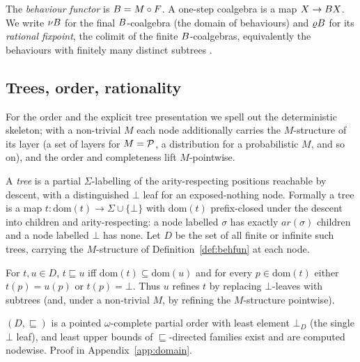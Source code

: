 \begin{definition}\label{def:behfun}
  The \emph{behaviour functor} is $B = M\circ F$. A one-step coalgebra is a map $X \to B X$. We
  write $\nu B$ for the final $B$-coalgebra (the domain of behaviours) and $\varrho B$ for its
  \emph{rational fixpoint}, the colimit of the finite $B$-coalgebras, equivalently the behaviours
  with finitely many distinct subtrees .
\end{definition}

\subsection{Trees, order, rationality}
For the order and the explicit tree presentation we spell out the deterministic skeleton; with a
non-trivial $M$ each node additionally carries the $M$-structure of its layer (a set of layers for
$M=\mathcal{P}$, a distribution for a probabilistic $M$, and so on), and the order and completeness lift
$M$-pointwise.

\begin{definition}[Trees]\label{def:domain}
  A \emph{tree} is a partial $\Sigma$-labelling of the arity-respecting positions reachable by
  descent, with a distinguished $\bot$ leaf for an exposed-nothing node. Formally a tree is a map
  $t\colon \mathrm{dom}(t) \to \Sigma \cup \{\bot\}$ with $\mathrm{dom}(t)$ prefix-closed under the
  descent into children and arity-respecting: a node labelled $\sigma$ has exactly $\mathit{ar}(\sigma)$
  children and a node labelled $\bot$ has none. Let $D$ be the set of all finite or infinite such trees,
  carrying the $M$-structure of Definition~\ref{def:behfun} at each node.
\end{definition}

\begin{definition}\label{def:order}
  For $t,u \in D$, $t \sqsubseteq u$ iff $\mathrm{dom}(t) \subseteq \mathrm{dom}(u)$ and for every
  $p \in \mathrm{dom}(t)$ either $t(p) = u(p)$ or $t(p) = \bot$. Thus $u$ refines $t$ by replacing
  $\bot$-leaves with subtrees (and, under a non-trivial $M$, by refining the $M$-structure
  pointwise).
\end{definition}

\begin{proposition}\label{prop:cpo}
  $(D,\sqsubseteq)$ is a pointed $\omega$-complete partial order with least element
  $\bot_D$ (the single $\bot$ leaf), and least upper bounds of $\sqsubseteq$-directed families exist and
  are computed nodewise. Proof in Appendix~\ref{app:domain}.
\end{proposition}

